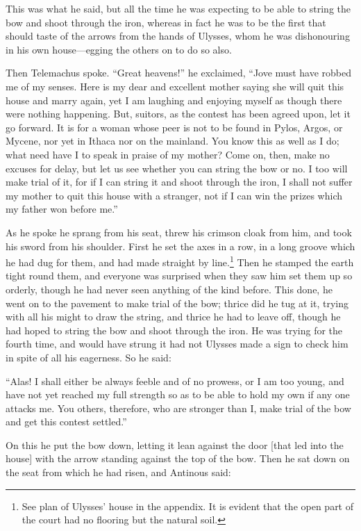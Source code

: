 This was what he said, but all the time he was expecting to be able to string
the bow and shoot through the iron, whereas in fact he was to be the first that
should taste of the arrows from the hands of Ulysses, whom he was dishonouring
in his own house—egging the others on to do so also.

Then Telemachus spoke. “Great heavens!” he exclaimed, “Jove must have robbed me
of my senses. Here is my dear and excellent mother saying she will quit this
house and marry again, yet I am laughing and enjoying myself as though there
were nothing happening. But, suitors, as the contest has been agreed upon, let
it go forward. It is for a woman whose peer is not to be found in Pylos, Argos,
or Mycene, nor yet in Ithaca nor on the mainland. You know this as well as I
do; what need have I to speak in praise of my mother? Come on, then, make no
excuses for delay, but let us see whether you can string the bow or no. I too
will make trial of it, for if I can string it and shoot through the iron, I
shall not suffer my mother to quit this house with a stranger, not if I can win
the prizes which my father won before me.”

As he spoke he sprang from his seat, threw his crimson cloak from him, and took
his sword from his shoulder. First he set the axes in a row, in a long groove
which he had dug for them, and had made straight by line.\footnote{See plan of Ulysses’ house in the appendix. It is evident that the open part
of the court had no flooring but the natural soil.} Then he
stamped the earth tight round them, and everyone was surprised when they saw
him set them up so orderly, though he had never seen anything of the kind
before. This done, he went on to the pavement to make trial of the bow; thrice
did he tug at it, trying with all his might to draw the string, and thrice he
had to leave off, though he had hoped to string the bow and shoot through the
iron. He was trying for the fourth time, and would have strung it had not
Ulysses made a sign to check him in spite of all his eagerness. So he said:

“Alas! I shall either be always feeble and of no prowess, or I am too young,
and have not yet reached my full strength so as to be able to hold my own if
any one attacks me. You others, therefore, who are stronger than I, make trial
of the bow and get this contest settled.”

On this he put the bow down, letting it lean against the door [that led into
the house] with the arrow standing against the top of the bow. Then he sat down
on the seat from which he had risen, and Antinous said:

